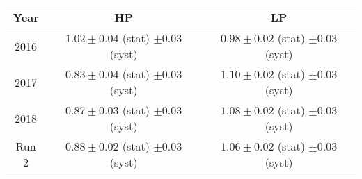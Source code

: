 \footnotesize
\begin{tabular}{|ccc|}
  \hline
  Year & HP & LP \\
  \hline
  2016  & $1.02 \pm 0.04$ (stat) $\pm 0.03$ (syst) & $0.98 \pm 0.02$ (stat) $\pm 0.03$ (syst)  \\
  2017  & $0.83 \pm 0.04$ (stat) $\pm 0.03$ (syst) & $1.10 \pm 0.02$ (stat) $\pm 0.03$ (syst)  \\
  2018  & $0.87 \pm 0.03$ (stat) $\pm 0.03$ (syst) & $1.08 \pm 0.02$ (stat) $\pm 0.03$ (syst)  \\
  Run 2 & $0.88 \pm 0.02$ (stat) $\pm 0.03$ (syst) & $1.06 \pm 0.02$ (stat) $\pm 0.03$ (syst)  \\
  \hline
\end{tabular}
